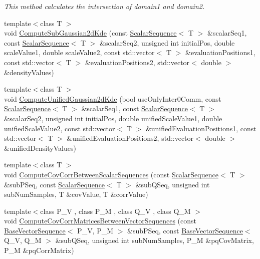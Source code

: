 \begin{DoxyCompactItemize}
\begin{DoxyCompactList}\small\item\em This method calculates the intersection of {\ttfamily domain1} and {\ttfamily domain2}. \end{DoxyCompactList}\item 
{\footnotesize template$<$class T $>$ }\\void \hyperlink{namespace_q_u_e_s_o_af865210b84a63c53796aff42989c4af7}{Compute\-Sub\-Gaussian2d\-Kde} (const \hyperlink{class_q_u_e_s_o_1_1_scalar_sequence}{Scalar\-Sequence}$<$ T $>$ \&scalar\-Seq1, const \hyperlink{class_q_u_e_s_o_1_1_scalar_sequence}{Scalar\-Sequence}$<$ T $>$ \&scalar\-Seq2, unsigned int initial\-Pos, double scale\-Value1, double scale\-Value2, const std\-::vector$<$ T $>$ \&evaluation\-Positions1, const std\-::vector$<$ T $>$ \&evaluation\-Positions2, std\-::vector$<$ double $>$ \&density\-Values)
\item 
{\footnotesize template$<$class T $>$ }\\void \hyperlink{namespace_q_u_e_s_o_af7a1e5f83b5acc46b51bc87eb3dc9b28}{Compute\-Unified\-Gaussian2d\-Kde} (bool use\-Only\-Inter0\-Comm, const \hyperlink{class_q_u_e_s_o_1_1_scalar_sequence}{Scalar\-Sequence}$<$ T $>$ \&scalar\-Seq1, const \hyperlink{class_q_u_e_s_o_1_1_scalar_sequence}{Scalar\-Sequence}$<$ T $>$ \&scalar\-Seq2, unsigned int initial\-Pos, double unified\-Scale\-Value1, double unified\-Scale\-Value2, const std\-::vector$<$ T $>$ \&unified\-Evaluation\-Positions1, const std\-::vector$<$ T $>$ \&unified\-Evaluation\-Positions2, std\-::vector$<$ double $>$ \&unified\-Density\-Values)
\item 
{\footnotesize template$<$class T $>$ }\\void \hyperlink{namespace_q_u_e_s_o_add6823a7271447445f532bf5ce73e9b8}{Compute\-Cov\-Corr\-Between\-Scalar\-Sequences} (const \hyperlink{class_q_u_e_s_o_1_1_scalar_sequence}{Scalar\-Sequence}$<$ T $>$ \&sub\-P\-Seq, const \hyperlink{class_q_u_e_s_o_1_1_scalar_sequence}{Scalar\-Sequence}$<$ T $>$ \&sub\-Q\-Seq, unsigned int sub\-Num\-Samples, T \&cov\-Value, T \&corr\-Value)
\item 
{\footnotesize template$<$class P\-\_\-\-V , class P\-\_\-\-M , class Q\-\_\-\-V , class Q\-\_\-\-M $>$ }\\void \hyperlink{namespace_q_u_e_s_o_ae194d12af9b08b130faf542b9b9ffe9b}{Compute\-Cov\-Corr\-Matrices\-Between\-Vector\-Sequences} (const \hyperlink{class_q_u_e_s_o_1_1_base_vector_sequence}{Base\-Vector\-Sequence}$<$ P\-\_\-\-V, P\-\_\-\-M $>$ \&sub\-P\-Seq, const \hyperlink{class_q_u_e_s_o_1_1_base_vector_sequence}{Base\-Vector\-Sequence}$<$ Q\-\_\-\-V, Q\-\_\-\-M $>$ \&sub\-Q\-Seq, unsigned int sub\-Num\-Samples, P\-\_\-\-M \&pq\-Cov\-Matrix, P\-\_\-\-M \&pq\-Corr\-Matrix)

\end{DoxyCompactItemize}
